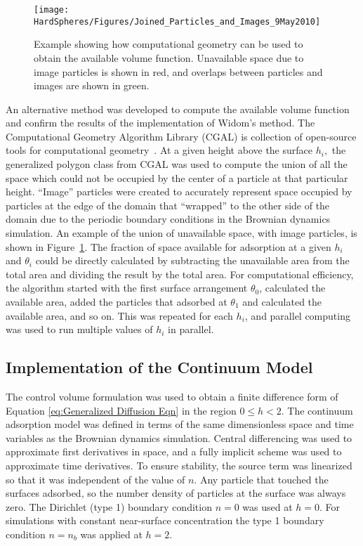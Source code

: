 %
\begin{figure}
\texttt{[image: HardSpheres/Figures/Joined\_Particles\_and\_Images\_9May2010]}

\caption{\label{fig:Computational geometry}Example showing how computational
geometry can be used to obtain the available volume function. Unavailable
space due to image particles is shown in red, and overlaps between
particles and images are shown in green.}


%
\end{figure}
An alternative method was developed to compute the available volume
function and confirm the results of the implementation of Widom's
method. The Computational Geometry Algorithm Library (CGAL) is collection
of open-source tools for computational geometry~\cite{CGAL}. At
a given height above the surface $h_{i},$ the generalized polygon
class from CGAL was used to compute the union of all the space which\emph{
}could not be occupied by the center of a particle at that particular
height. {}``Image'' particles were created to accurately represent
space occupied by particles at the edge of the domain that {}``wrapped''
to the other side of the domain due to the periodic boundary conditions
in the Brownian dynamics simulation. An example of the union of unavailable
space, with image particles, is shown in Figure~\ref{fig:Computational geometry}.
The fraction of space available for adsorption at a given $h_{i}$
and $\theta_{i}$ could be directly calculated by subtracting the
unavailable area from the total area and dividing the result by the
total area. For computational efficiency, the algorithm started with
the first surface arrangement $\theta_{0}$, calculated the available
area, added the particles that adsorbed at $\theta_{1}$ and calculated
the available area, and so on. This was repeated for each $h_{i}$,
and parallel computing was used to run multiple values of $h_{i}$
in parallel.


\subsection{Implementation of the Continuum Model}

The control volume formulation \cite{Patankar1980} was used to obtain
a finite difference form of Equation \ref{eq:Generalized Diffusion Eqn}
in the region $0\leq h<2$. The continuum adsorption model was defined
in terms of the same dimensionless space and time variables as the
Brownian dynamics simulation. Central differencing was used to approximate
first derivatives in space, and a fully implicit scheme was used to
approximate time derivatives. To ensure stability, the source term
was linearized so that it was independent of the value of $n$. Any
particle that touched the surfaces adsorbed, so the number density
of particles at the surface was always zero. The Dirichlet (type 1)
boundary condition $n=0$ was used at $h=0$. For simulations with
constant near-surface concentration the type 1 boundary condition
$n=n_{b}$ was applied at $h=2$. 


